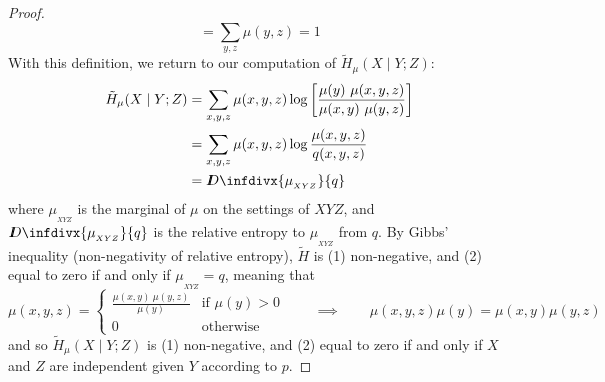\documentclass{article}
\theoremstyle{plain}
\theoremstyle{definition}
\theoremstyle{remark}
\newcommand{\thickD}{I\mkern-8muD}
\newcommand{\kldiv}{\thickD\infdivx}%
\numberwithin{equation}{section}
\begin{document}
\begin{proof}
\[	= \sum_{y,z}  \mu(y,z)
	= 1
	\]	
	With this definition, we return to our computation of $\tilde H_\mu(X \mid Y; Z)$:
	\begin{align*}
		\tilde H_\mu(X \mid Y; Z) &= \sum_{x,y, z}  \mu(x,y ,z) \log \left[\frac{\mu(y)\ \mu(x,y,z)}{\mu(x,y)\ \mu(y,z)} \right]  \\ %
		&= \sum_{x,y, z}  \mu(x,y ,z) \log \frac{\mu(x,y,z)}{q(x,y,z)}  \\
		&= \kldiv{\mu_{_{XYZ}}}{q}
	\end{align*}
	where $\mu_{_{XYZ}}$ is the marginal of $\mu$ on the settings of $XYZ$, and $\kldiv{\mu_{_{XYZ}}}{q}$ is the relative entropy to $\mu_{_{XYZ}}$ from $q$. By Gibbs' inequality (non-negativity of relative entropy), $\tilde H$ is  (1) non-negative, and (2) equal to zero if and only if $\mu_{_{XYZ}} = q$, meaning that 
	\[  \mu(x,y,z) =\begin{cases} \frac{\mu(x,y)\ \mu(y,z)}{\mu(y)} & \text{if }\mu(y) > 0\\ 0 & \text{otherwise} \end{cases} \qquad \implies \qquad \mu(x,y,z) \mu(y) = \mu(x,y) \mu(y, z) \] 
	and so $\tilde H_\mu(X \mid Y; Z)$ is (1) non-negative, and (2) equal to zero if and only if $X$ and $Z$ are independent given $Y$ according to $p$.
\end{proof}
\end{document}
